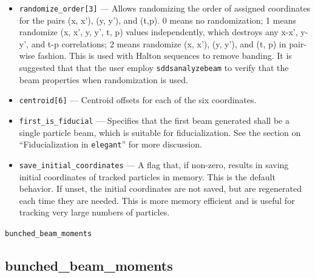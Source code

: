 \documentclass[11pt]{article}
\begin{document}
\begin{itemize}
A suggested way to use Halton sequences is to set
\verb|halton_radix[0] = 2, 3, 2, 3, 2, 3| and
to set 
\verb|randomize_order[0] = 2, 2, 2,|.  This avoids banding that may
result from choosing larger radix values.

\verb|optimized_halton| uses the improved halton sequence \cite{Chi2005}.
(Algorithm 659, Collected Algorithm from ACM. Derandom Algorithm is added
by Hongmei CHI (CS/FSU)). It avoids the banding problem automatically and
the \verb|halton_radix| values are ignored.

\item \verb|randomize_order[3]| --- Allows randomizing the order of
assigned coordinates for the pairs (x, x'), (y, y'), and (t,p).  0
means no randomization; 1 means randomize (x, x', y, y', t, p) values
independently, which destroys any x-x', y-y', and t-p correlations; 2
means randomize (x, x'), (y, y'), and (t, p) in pair-wise fashion.
This is used with Halton sequences to remove banding.  It is suggested
that that the user employ \verb|sddsanalyzebeam| to verify that the
beam properties when randomization is used.

\item \verb|centroid[6]| --- Centroid offsets for each of the six coordinates.

\item \verb|first_is_fiducial| --- Specifies that the first beam
generated shall be a single particle beam, which is suitable for
fiducialization.  See the section on ``Fiducialization in
\verb|elegant|'' for more discussion.

\item \verb|save_initial_coordinates| --- A flag that, if non-zero, results
in saving initial coordinates of tracked particles in memory.  This is
the default behavior.  If unset, the initial coordinates are not
saved, but are regenerated each time they are needed.  This is more
memory efficient and is useful for tracking very large numbers of
particles.
\end{itemize}

\newpage
\begin{center}{\Large\verb|bunched_beam_moments|}\end{center}
\subsection{bunched\_beam\_moments \label{subsec:bunchedbeammoments}}
\end{document}
